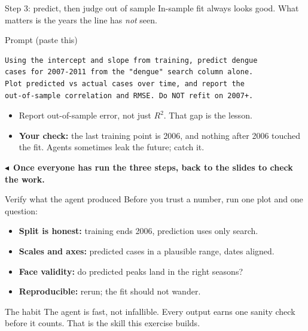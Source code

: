 \documentclass[aspectratio=169,11pt]{beamer}
\newcommand{\toslides}[1]{\vspace{0.1em}\begin{flushright}\footnotesize\textcolor{AccentC}{$\blacktriangleleft$~\textbf{#1}}\end{flushright}}
\begin{document}
\begin{frame}[fragile]{Step 3: predict, then judge out of sample}
  In-sample fit always looks good. What matters is the years the line has \emph{not} seen.
  \begin{block}{Prompt (paste this)}
  \begin{lstlisting}
Using the intercept and slope from training, predict dengue
cases for 2007-2011 from the "dengue" search column alone.
Plot predicted vs actual cases over time, and report the
out-of-sample correlation and RMSE. Do NOT refit on 2007+.
  \end{lstlisting}
  \end{block}
  \begin{itemize}
    \item Report out-of-sample error, not just $R^2$. That gap is the lesson.
    \item \textbf{Your check:} the last training point is 2006, and nothing after 2006
          touched the fit. Agents sometimes leak the future; catch it.
  \end{itemize}
  \toslides{Once everyone has run the three steps, back to the slides to check the work.}
\end{frame}

\begin{frame}{Verify what the agent produced}
  Before you trust a number, run one plot and one question:
  \begin{itemize}
    \item \textbf{Split is honest:} training ends 2006, prediction uses only search.
    \item \textbf{Scales and axes:} predicted cases in a plausible range, dates aligned.
    \item \textbf{Face validity:} do predicted peaks land in the right seasons?
    \item \textbf{Reproducible:} rerun; the fit should not wander.
  \end{itemize}
  \vspace{0.3em}
  \begin{alertblock}{The habit}
    The agent is fast, not infallible. Every output earns one sanity check before it
    counts. That is the skill this exercise builds.
  \end{alertblock}
\end{frame}
\end{document}
